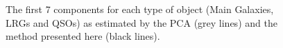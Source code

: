 \documentclass[12pt,preprint]{aastex}
\begin{document}
\begin{figure}
\caption{The first 7 components for each type of object (Main Galaxies, LRGs and QSOs) as estimated by the PCA (grey lines) and the method presented here (black lines).}
\label{fig:2}
\end{figure}
\end{document}
